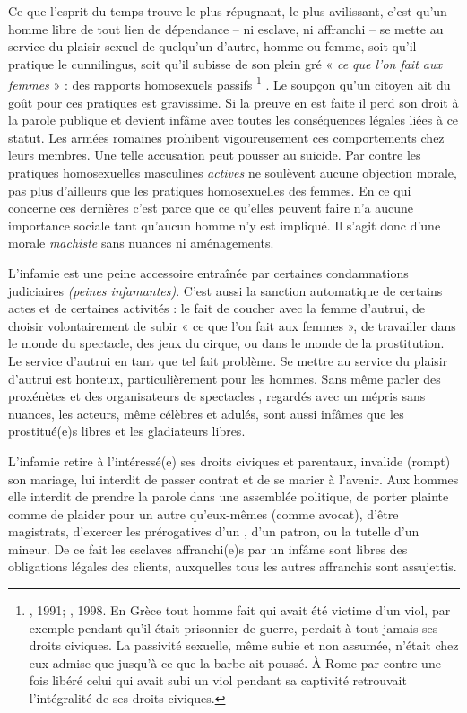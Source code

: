  Ce que l'esprit du temps trouve le plus répugnant, le plus avilissant, c'est qu'un homme libre de tout lien de dépendance -- ni esclave, ni affranchi -- se mette au service du plaisir sexuel de quelqu'un d'autre, homme ou femme, soit qu'il pratique le cunnilingus, soit qu'il subisse de son plein gré « \emph{ce que l'on fait aux femmes} » : des rapports homosexuels passifs%
\footnote{, 1991; , 1998. En Grèce tout homme fait qui avait été victime d'un viol, par exemple pendant qu'il était prisonnier de guerre, perdait à tout jamais ses droits civiques. La passivité sexuelle, même subie et non assumée, n'était chez eux admise que jusqu'à ce que la barbe ait poussé. À Rome par contre une fois libéré celui qui avait subi un viol pendant sa captivité retrouvait l'intégralité de ses droits civiques.}%
. Le soupçon qu'un citoyen ait du goût pour ces pratiques est gravissime. Si la preuve en est faite il perd son droit à la parole publique et devient infâme avec toutes les conséquences légales liées à ce statut. Les armées romaines prohibent vigoureusement ces comportements chez leurs membres. Une telle accusation peut pousser au suicide. Par contre les pratiques homosexuelles masculines \emph{actives} ne soulèvent aucune objection morale, pas plus d'ailleurs que les pratiques homosexuelles des femmes. En ce qui concerne ces dernières c'est parce que ce qu'elles peuvent faire n'a aucune importance sociale tant qu'aucun homme n'y est impliqué. Il s'agit donc d'une morale \emph{machiste} sans nuances ni aménagements.

 L'infamie est une peine accessoire entraînée par certaines condamnations judiciaires \emph{(peines infamantes)}. C'est aussi la sanction automatique de certains actes et de certaines activités : le fait de coucher avec la femme d'autrui, de choisir volontairement de subir « ce que l'on fait aux femmes », de travailler dans le monde du spectacle, des jeux du cirque, ou dans le monde de la prostitution. Le service d'autrui en tant que tel fait problème. Se mettre au service du plaisir d'autrui est honteux, particulièrement pour les hommes. Sans même parler des proxénètes et des organisateurs de spectacles , regardés avec un mépris sans nuances, les acteurs, même célèbres et adulés, sont aussi infâmes que les prostitué(e)s libres et les gladiateurs libres.

 L'infamie retire à l'intéressé(e) ses droits civiques et parentaux, invalide (rompt) son mariage, lui interdit de passer contrat et de se marier à l'avenir. Aux hommes elle interdit de prendre la parole dans une assemblée politique, de porter plainte comme de plaider pour un autre qu'eux-mêmes (comme avocat), d'être magistrats, d'exercer les prérogatives d'un , d'un patron, ou la tutelle d'un mineur. De ce fait les esclaves affranchi(e)s par un infâme sont libres des obligations légales des clients, auxquelles tous les autres affranchis sont assujettis.

